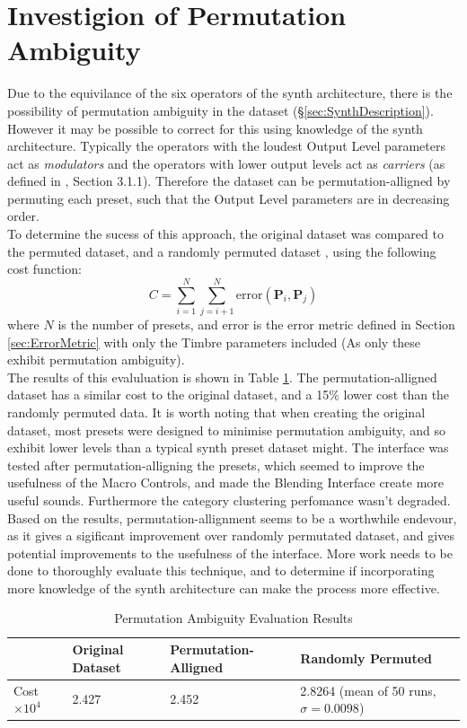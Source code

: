 \documentclass[11pt, oneside]{report}   	%
\renewcommand{\vec}[1]{\mathbf{#1}}
\begin{document}
\section{Investigion of Permutation Ambiguity}\label{sec:PermutationAmbiguity}
Due to the equivilance of the six operators of the synth architecture, there is the possibility of permutation ambiguity in the dataset (\S \ref{sec:SynthDescription}). However it may be possible to correct for this using knowledge of the synth architecture. Typically the operators with the loudest Output Level parameters act as \emph{modulators} and the operators with lower output levels act as \emph{carriers} (as defined in \cite{YeeKing}, Section 3.1.1). Therefore the dataset can be permutation-alligned by permuting each preset, such that the Output Level parameters are in decreasing order.\\
To determine the sucess of this approach, the original dataset was compared to the permuted dataset, and a randomly permuted dataset , using the following cost function:
\begin{equation}
	C = \sum_{i = 1}^{N}\sum_{j = i+1}^{N}\mathrm{error}(\vec{P}_i, \vec{P}_j)
\end{equation}
where $N$ is the number of presets, and $\mathrm{error}$ is the error metric defined in Section \ref{sec:ErrorMetric} with only the Timbre parameters included (As only these exhibit permutation ambiguity).\\
The results of this evaluluation is shown in Table \ref{tab:PermutationAmbiguity}. The permutation-alligned dataset has a similar cost to the original dataset, and a 15\% lower cost than the randomly permuted data. It is worth noting that when creating the original dataset, most presets were designed to minimise permutation ambiguity, and so exhibit lower levels than a typical synth preset dataset might.  The interface was tested after permutation-alligning the presets, which seemed to improve the usefulness of the Macro Controls, and made the Blending Interface create more useful sounds. Furthermore the category clustering perfomance wasn't degraded. Based on the results, permutation-allignment seems to be a worthwhile endevour, as it gives a sigificant improvement over randomly permutated dataset, and gives potential improvements to the usefulness of the interface. More work needs to be done to thoroughly evaluate this technique, and to determine if incorporating more knowledge of the synth architecture can make the process more effective.
\begin{table}[h]
	\vspace{-20pt}
	\centering
	\begin{tabular}{l|l|l|l}
		& Original Dataset & Permutation-Alligned & Randomly Permuted \\ \hline
		Cost $\times 10^4$ & 2.427            & 2.452                 & 2.8264  (mean of 50 runs, $\sigma = 0.0098$)
	\end{tabular}
\caption{Permutation Ambiguity Evaluation Results}
\label{tab:PermutationAmbiguity}
\vspace{-20pt}
\end{table}
\end{document}
